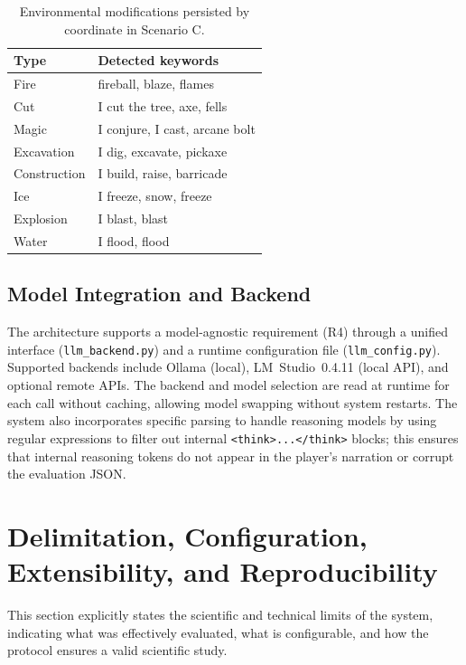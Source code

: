 \documentclass[12pt]{article}
\begin{document}
\begin{table}[ht]
\centering
\caption{Environmental modifications persisted by coordinate in Scenario C.}
\label{tab:env-modifications}
\begin{tabular}{ll}
\toprule
\textbf{Type} & \textbf{Detected keywords} \\
\midrule
Fire        & fireball, blaze, flames \\
Cut         & I cut the tree, axe, fells \\
Magic       & I conjure, I cast, arcane bolt \\
Excavation  & I dig, excavate, pickaxe \\
Construction & I build, raise, barricade \\
Ice         & I freeze, snow, freeze \\
Explosion   & I blast, blast \\
Water       & I flood, flood \\
\bottomrule
\end{tabular}
\end{table}

\subsection{Model Integration and Backend}

The architecture supports a model-agnostic requirement (R4) through a unified interface (\texttt{llm\_backend.py}) and a runtime configuration file (\texttt{llm\_config.py}). Supported backends include Ollama (local), LM~Studio~0.4.11 (local API), and optional remote APIs. The backend and model selection are read at runtime for each call without caching, allowing model swapping without system restarts. The system also incorporates specific parsing to handle reasoning models by using regular expressions to filter out internal \texttt{<think>...</think>} blocks; this ensures that internal reasoning tokens do not appear in the player's narration or corrupt the evaluation JSON.

\section{Delimitation, Configuration, Extensibility, and Reproducibility}
\label{sec:delimitation}

This section explicitly states the scientific and technical limits of the system, indicating what was effectively evaluated, what is configurable, and how the protocol ensures a valid scientific study.
\end{document}
